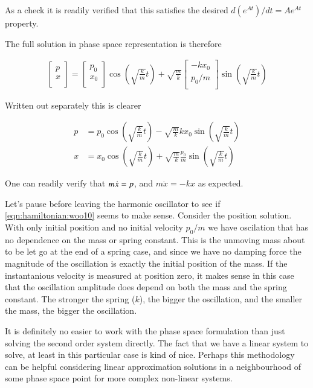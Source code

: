 As a check it is readily verified that this satisfies the desired $d(e^{At})/dt = A e^{At}$ property.

The full solution in phase space representation is therefore

\begin{align}\label{eqn:hamiltonian:woo9}
\begin{bmatrix}
p \\
x \\
\end{bmatrix}
=
\begin{bmatrix}
p_0 \\
x_0 \\
\end{bmatrix}
\cos\left(\sqrt{\frac{k}{m}} t\right) 
+ \sqrt{\frac{m}{k}}
\begin{bmatrix}
-k x_0 \\
p_0/m \\
\end{bmatrix}
\sin\left(\sqrt{\frac{k}{m}} t\right)
\end{align}

Written out separately this is clearer

\begin{align}\label{eqn:hamiltonian:woo10}
p &= p_0 \cos\left(\sqrt{\frac{k}{m}} t\right) - \sqrt{\frac{m}{k}} k x_0 \sin\left(\sqrt{\frac{k}{m}} t\right) \\
x &= x_0 \cos\left(\sqrt{\frac{k}{m}} t\right) + \sqrt{\frac{m}{k}} \frac{p_0}{m} \sin\left(\sqrt{\frac{k}{m}} t\right)
\end{align}

One can readily verify that $m \dot{x} = p$, and $m \ddot{x} = -k x$ as expected.

Let's pause before leaving the harmonic oscillator to see if \ref{eqn:hamiltonian:woo10} seems to make sense.  Consider the position solution.  With only initial position and no initial velocity $p_0/m$ we have oscilation that has no dependence on the mass or spring constant.  This is the unmoving mass about to be let go at the end of a spring case, and since we have no damping force the magnitude of the oscillation is exactly the initial position of the mass.  If the instantanious velocity is measured at position zero, it makes sense in this case that the oscillation amplitude does depend on both the mass and the spring constant.  The stronger the spring ($k$), the bigger the oscillation, and the smaller the mass, the bigger the oscillation.

It is definitely no easier to work with the phase space formulation than just solving the second order system directly.  The fact that we have a linear system to solve, at least in this particular case is kind of nice.  Perhaps this methodology can be helpful considering linear approximation solutions in a neighbourhood of some phase space point for more complex non-linear systems.

